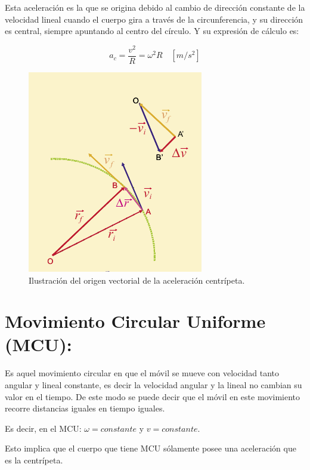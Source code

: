 \documentclass[a5paper,pagesize,10pt,bibtotoc,pointlessnumbers,
normalheadings,DIV=9,fleqn,x11names,table,twoside=false]{scrbook}
\begin{document}
Esta aceleración es la que se origina debido al cambio de dirección constante de la velocidad lineal cuando el cuerpo gira a 
través de la circunferencia, y su dirección es central, siempre apuntando al centro del círculo. Y su expresión de cálculo es:

\begin{equation}
a_c = \frac{v^2}{R} =  \omega^2 R\quad [m/s^2]
\end{equation}

\begin{figure}[ht]
 \centering
 \includegraphics[scale=0.6]{images/acentripeta.png}
 \caption{Ilustración del origen vectorial de la aceleración centrípeta.}\label{ac}
\end{figure} 

\section{Movimiento Circular Uniforme (MCU):}

Es aquel movimiento circular en que el móvil se mueve con velocidad tanto angular y lineal constante, es decir la velocidad 
angular y la lineal no cambian su valor en el tiempo. De este modo se puede decir que el móvil en este movimiento recorre 
distancias iguales en tiempo iguales. 

\begin{tcolorbox}
Es decir, en el MCU: $\omega = constante$ y $v = constante.$
\end{tcolorbox}

Esto implica que el cuerpo que tiene MCU sólamente posee una aceleración que es la centrípeta.
\end{document}
